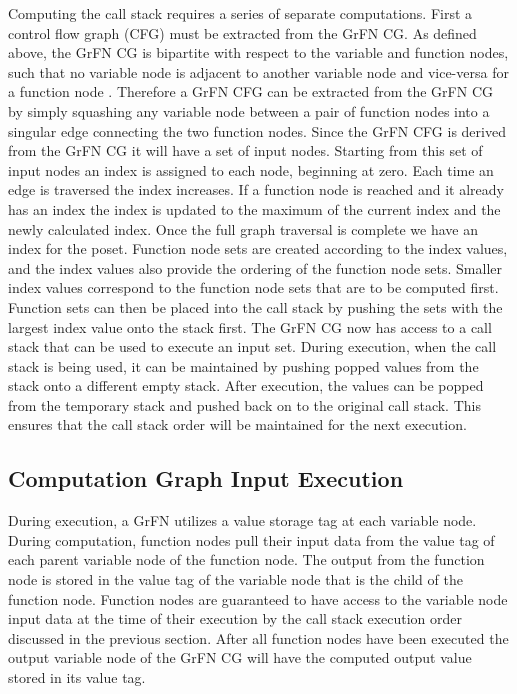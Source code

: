Computing the call stack requires a series of separate computations.
First a control flow graph (CFG) \citep{allen1970CFG} must be extracted from the GrFN CG.
As defined above, the GrFN CG is bipartite with respect to the variable and function nodes, such that no variable node is adjacent to another variable node and vice-versa for a function node \citep{bondy1976graph}.
Therefore a GrFN CFG can be extracted from the GrFN CG by simply squashing any variable node between a pair of function nodes into a singular edge connecting the two function nodes.
Since the GrFN CFG is derived from the GrFN CG it will have a set of input nodes.
Starting from this set of input nodes an index is assigned to each node, beginning at zero.
Each time an edge is traversed the index increases.
If a function node is reached and it already has an index the index is updated to the maximum of the current index and the newly calculated index.
Once the full graph traversal is complete we have an index for the poset.
Function node sets are created according to the index values, and the index values also provide the ordering of the function node sets.
Smaller index values correspond to the function node sets that are to be computed first.
Function sets can then be placed into the call stack by pushing the sets with the largest index value onto the stack first.
The GrFN CG now has access to a call stack that can be used to execute an input set.
During execution, when the call stack is being used, it can be maintained by pushing popped values from the stack onto a different empty stack.
After execution, the values can be popped from the temporary stack and pushed back on to the original call stack. This ensures that the call stack order will be maintained for the next execution.

\subsection{Computation Graph Input Execution\label{sec:input_execution}}
During execution, a GrFN utilizes a value storage tag at each variable node.
During computation, function nodes pull their input data from the value tag of each parent variable node of the function node.
The output from the function node is stored in the value tag of the variable node that is the child of the function node.
Function nodes are guaranteed to have access to the variable node input data at the time of their execution by the call stack execution order discussed in the previous section.
After all function nodes have been executed the output variable node of the GrFN CG will have the computed output value stored in its value tag.


